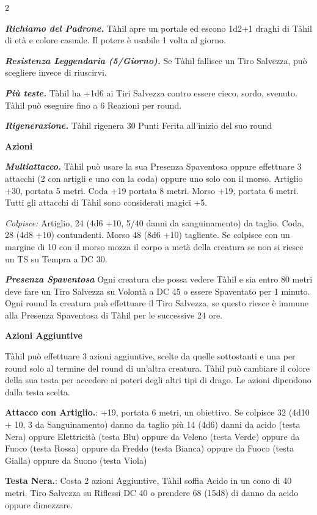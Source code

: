 \begin{multicols}{2}
{\emph{\textbf{Richiamo del Padrone.}} Tàhil apre un portale ed escono 1d2+1 draghi di Tàhil di età e colore casuale. Il potere è usabile 1 volta al giorno.

\emph{\textbf{Resistenza Leggendaria (5/Giorno).}} Se Tàhil fallisce un Tiro Salvezza, può scegliere invece di riuscirvi.

\emph{\textbf{Più teste.}} Tàhil ha +1d6 ai Tiri Salvezza contro essere cieco, sordo, svenuto. Tàhil può eseguire fino a 6 Reazioni per round.

\emph{\textbf{Rigenerazione.}} Tàhil rigenera 30 Punti Ferita all'inizio del suo round

\textbf{Azioni}

\emph{\textbf{Multiattacco.}} Tàhil può usare la sua Presenza Spaventosa oppure effettuare 3 attacchi (2 con artigli e uno con la coda) oppure uno solo con il morso. Artiglio +30, portata 5 metri. Coda +19 portata 8 metri. Morso +19, portata 6 metri. Tutti gli attacchi di Tàhil sono considerati magici +5.

\emph{Colpisce:} Artiglio, 24 (4d6 +10, 5/40 danni da sanguinamento) da taglio. Coda, 28 (4d8 +10) contundenti. Morso 48 (8d6 +10) tagliente. Se colpisce con un margine di 10 con il morso mozza il corpo a metà della creatura se non si riesce un TS su Tempra a DC 30.

\emph{\textbf{Presenza Spaventosa}} Ogni creatura che possa vedere Tàhil e sia entro 80 metri deve fare un Tiro Salvezza su Volontà a DC 45 o essere Spaventato per 1 minuto. Ogni round la creatura può effettuare il Tiro Salvezza, se questo riesce è immune alla Presenza Spaventosa di Tàhil per le successive 24 ore.

\textbf{Azioni Aggiuntive}

Tàhil può effettuare 3 azioni aggiuntive, scelte da quelle sottostanti e una per round solo al termine del round di un'altra creatura. Tàhil può cambiare il colore della sua testa per accedere ai poteri degli altri tipi di drago. Le azioni dipendono dalla testa scelta.

\textbf{Attacco con Artiglio.}: +19, portata 6 metri, un obiettivo. Se colpisce 32 (4d10 + 10, 3 da Sanguinamento) danno da taglio più 14 (4d6) danni da acido (testa Nera) oppure Elettricità (testa Blu) oppure da Veleno (testa Verde) oppure da Fuoco (testa Rossa) oppure da Freddo (testa Bianca) oppure da Fuoco (testa Gialla) oppure da Suono (testa Viola)

\textbf{Testa Nera.}: Costa 2 azioni Aggiuntive, Tàhil soffia Acido in un cono di 40 metri. Tiro Salvezza su Riflessi DC 40 o prendere 68 (15d8) di danno da acido oppure dimezzare.

}
\end{multicols}
